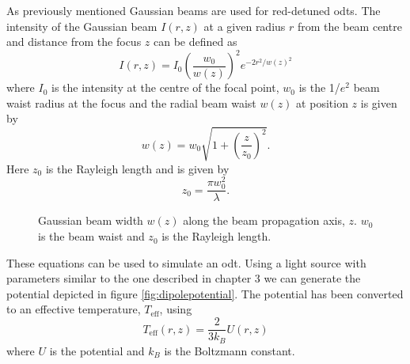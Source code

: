As previously mentioned Gaussian beams are used for red-detuned \glspl{odt}. The intensity of the Gaussian beam $I(r, z)$ at a given radius $r$ from the beam centre and distance from the focus $z$ can be defined as\cite{saleh_fundamentals_2007}
\begin{equation}
I(r, z) = I_0 \left( \frac{w_0}{w(z)}\right)^2 e^{-2r^2/w(z)^2}
\end{equation}
where $I_0$ is the intensity at the centre of the focal point, $w_0$ is the 1/$e^2$ beam waist radius at the focus and the radial beam waist $w(z)$ at position $z$ is given by
\begin{equation}
w(z) = w_0\sqrt{1 + \left(\frac{z}{z_0} \right)^2}.
\end{equation}
Here $z_0$ is the Rayleigh length and is given by
\begin{equation}
z_0 = \frac{\pi w_0^2}{\lambda}.
\end{equation}

\begin{figure}[h]
\centering
{}

\caption{Gaussian beam width $w(z)$ along the beam propagation axis, $z$. $w_0$ is the beam waist and $z_0$ is the Rayleigh length.}
\end{figure}

These equations can be used to simulate an \gls{odt}. Using a light source with parameters similar to the one described in chapter 3 we can generate the potential depicted in figure \ref{fig:dipolepotential}. The potential has been converted to an effective temperature, $T_{\mathrm{eff}}$, using
\begin{equation}
T_{\mathrm{eff}}(r, z) = \frac{2}{3 k_B} U(r, z)
\end{equation}
where $U$ is the potential and $k_B$ is the Boltzmann constant.

